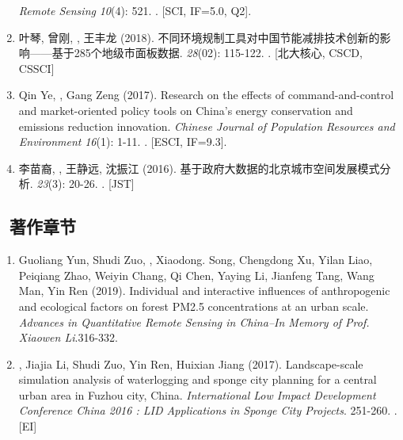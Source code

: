 \begin{enumerate}
    \textit{Remote Sensing} \textit{10}(4): 521.
    . [SCI, IF=5.0, Q2].
\item
    叶琴, 曾刚, {}, 王丰龙 (2018).
	不同环境规制工具对中国节能减排技术创新的影响——基于285个地级市面板数据.
    {} \textit{28}(02): 115-122.
    . [北大核心, CSCD, CSSCI]
\item
    Qin Ye, \Shaoqing, Gang Zeng (2017).
	Research on the effects of command-and-control and market-oriented policy tools on China’s energy conservation and emissions reduction innovation.
    \textit{Chinese Journal of Population Resources and Environment} \textit{16}(1): 1-11.
    . [ESCI, IF=9.3].
\item
   李苗裔, {}, 王静远, 沈振江 (2016).
	基于政府大数据的北京城市空间发展模式分析.
    {} \textit{23}(3): 20-26.
    . [JST]
\end{enumerate}

\subsection*{\texorpdfstring{\faBook\ 著作章节}{著作章节}}
\begin{enumerate}
\item
    Guoliang Yun, Shudi Zuo, \Shaoqing, Xiaodong. Song, Chengdong Xu, Yilan Liao, Peiqiang Zhao, Weiyin Chang, Qi Chen, Yaying Li, Jianfeng Tang, Wang Man, Yin Ren (2019).
	Individual and interactive influences of anthropogenic and ecological factors on forest PM2.5 concentrations at an urban scale.
    \textit{Advances in Quantitative Remote Sensing in China–In Memory of Prof. Xiaowen Li}.316-332.
\item
    \Shaoqing, Jiajia Li, Shudi Zuo, Yin Ren, Huixian Jiang (2017).
	Landscape-scale simulation analysis of waterlogging and sponge city planning for a central urban area in Fuzhou city, China.
    \textit{International Low Impact Development Conference China 2016 : LID Applications in Sponge City Projects}. 251-260.
    . [EI]
\end{enumerate}

